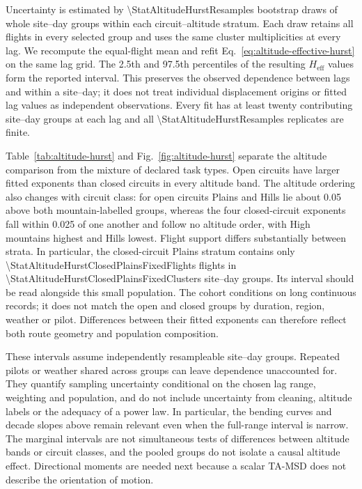 Uncertainty is estimated by \num{\StatAltitudeHurstResamples} bootstrap draws
of whole site--day groups within each circuit--altitude stratum. Each draw retains all
flights in every selected group and uses the same cluster multiplicities at
every lag. We recompute the equal-flight mean and
refit Eq.~\eqref{eq:altitude-effective-hurst} on the same lag grid. The 2.5th and
97.5th percentiles of the resulting $H_{\mathrm{eff}}$ values form the reported
interval. This preserves the observed dependence between lags and within a
site--day; it does not treat individual displacement origins or fitted lag
values as independent observations. Every fit has at least twenty contributing
site--day groups at each lag and all
\num{\StatAltitudeHurstResamples} replicates are finite.

\begin{table}[htbp]
 \centering
 \caption{Paraglider effective exponents $H_{\mathrm{eff}}$ from the full
 10--10,000-s fit, separately for declared open and closed circuits.
 Brackets give marginal 95\% site--day bootstrap intervals. Flight counts give the
 fixed cohort, which contributes the same flights at every lag. Weighting matches
 Fig.~\ref{fig:altitude-hurst}.}
 \label{tab:altitude-hurst}
 \small
 
\end{table}

Table~\ref{tab:altitude-hurst} and Fig.~\ref{fig:altitude-hurst} separate the
altitude comparison from the mixture of declared task types. Open circuits have
larger fitted exponents than closed circuits in every altitude band. The altitude
ordering also changes with circuit class: for open circuits Plains and Hills lie
about 0.05 above both mountain-labelled groups, whereas the four closed-circuit
exponents fall within 0.025 of one another and follow no altitude order, with High
mountains highest and Hills lowest. Flight support differs substantially between
strata. In particular, the closed-circuit Plains stratum contains only
\num{\StatAltitudeHurstClosedPlainsFixedFlights} flights in
\num{\StatAltitudeHurstClosedPlainsFixedClusters} site--day groups. Its interval
should be read alongside this small population. The cohort conditions on long
continuous records; it does not match the open and closed groups by duration,
region, weather or pilot. Differences between their fitted exponents can therefore
reflect both route geometry and population composition.

These intervals assume independently resampleable site--day groups. Repeated
pilots or weather shared across groups can leave dependence unaccounted for.
They quantify sampling uncertainty conditional on the chosen lag range,
weighting and population, and do not include uncertainty from cleaning,
altitude labels or the adequacy of a power law. In particular, the bending
curves and decade slopes above remain relevant even when the full-range
interval is narrow. The marginal intervals are not simultaneous tests of
differences between altitude bands or circuit classes, and the pooled groups do not isolate a
causal altitude effect. Directional moments are needed next because a scalar
TA-MSD does not describe the orientation of motion.

\FloatBarrier
\FloatBarrier
\endgroup
